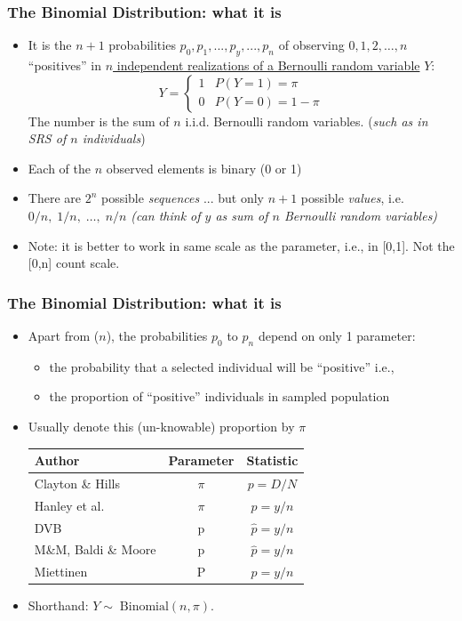 \documentclass[10pt]{beamer}\usepackage[]{graphicx}\usepackage[]{color}
\begin{document}
\begin{frame}
	\frametitle{The Binomial Distribution: what it is}
	\small
	\begin{itemize}
		\setlength\itemsep{0.5em}
		\item It is the $n+1$ probabilities $p_{0}, p_{1}, ..., p_{y}, ..., p_{n}$ of observing 
		$0, 1, 2, \dots , n$ ``positives''  in \underline{$n$ independent realizations of a Bernoulli random variable} $Y$:
		$$
		Y = \begin{cases}
		1 & P(Y=1) = \pi \\
		0 & P(Y=0) = 1-\pi
		\end{cases}	
		$$
		The number is the sum of $n$ i.i.d. Bernoulli random variables.	(\emph{such as in SRS of $n$ individuals}) \pause 
		\item Each of the $n$ observed elements is binary (0 or 1) %
		\item There are $2^{n}$ possible \textit{sequences} ... but only $n+1$ possible \textit{values}, 
		i.e. $0/n,\;1/n,\;\dots ,\;n/n$  \emph{(can think of $y$ as sum of $n$ Bernoulli random variables)} 
		\item Note: it is better to work in same scale as the parameter, i.e., in [0,1]. Not the [0,n] count scale.
	\end{itemize}
\end{frame}	

\begin{frame}
	\frametitle{The Binomial Distribution: what it is}
	\begin{itemize}
		\setlength\itemsep{0.5em}
		\item Apart from  ($n$), the probabilities $p_{0}$ to $p_{n}$ depend on only 1 parameter:
		\begin{itemize}
			\item the probability that a selected individual will be ``positive''  i.e.,
			\item the proportion of ``positive'' individuals in sampled population
		\end{itemize}
		
		\item Usually denote this (un-knowable) proportion by $\pi$
		
		\begin{tabular}{lcc}
			\hline
			Author & \textbf{Parameter} & \textbf{Statistic} \\
			\hline
			Clayton \& Hills   & $\pi $ & $p= D/N$ \\
			Hanley et al. & $\pi $ & $p= y/n$ \\
			DVB & p &$\hat{p} = y/n$ \\
			M\&M, Baldi \& Moore & p &$\hat{p} = y/n$ \\
			Miettinen& P & $p=y/n$ \\
			\hline
		\end{tabular}
		\item
		Shorthand:  $Y\sim\; \textrm{Binomial}(n, \pi)$.
	\end{itemize}
\end{frame}
\end{document}
